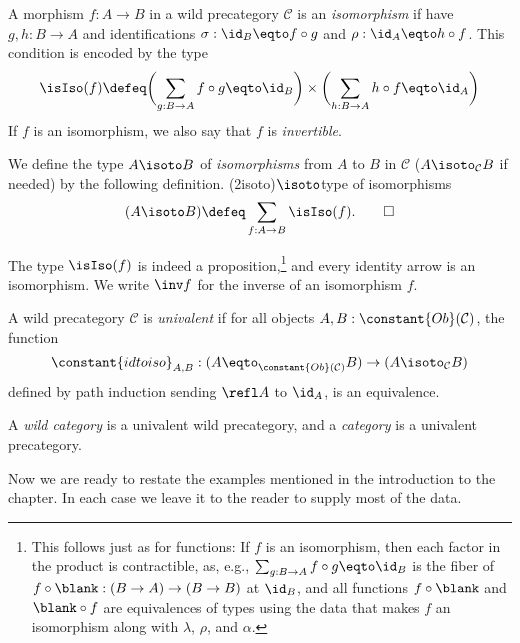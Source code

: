 \begin{definition}
  A morphism $f : A \to B$ in a wild precategory $\mathcal{C}$ is an
  \emph{isomorphism}
  if have $g, h : B \to A$ and identifications
  $\sigma : \id_B \eqto f\circ g$ and $\rho : \id_A \eqto h\circ f$.
  This condition is encoded by the type
  \[
    \isIso(f) \defeq \biggl(\sum_{g:B\to A}f\circ g\eqto\id_B\biggr)
    \times\biggl(\sum_{h:B\to A}h\circ f\eqto\id_A\biggr)
  \]
  If $f$ is an isomorphism, we also say that $f$ is \emph{invertible}.

  We define the type $A \isoto B$ of \emph{isomorphisms} from $A$ to $B$
  in $\mathcal C$ ($A \isoto_{\mathcal C} B$ if needed)
  by the following definition.%
  \glossary(2isoto){$\protect\isoto$}{type of isomorphisms}
  \[
    (A \isoto B) \defeq \sum_{f:A\to B} \isIso(f).\qedhere
  \]
\end{definition}
The type $\isIso(f)$
is indeed a proposition,\footnote{%
  This follows just as for functions: If $f$ is an isomorphism,
  then each factor in the product is contractible, as, e.g.,
  $\sum_{g:B\to A}f\circ g\eqto\id_B$ is the fiber
  of $f\circ\blank : (B \to A) \to (B \to B)$
  at $\id_B$, and all functions $f\circ\blank$ and $\blank\circ f$
  are equivalences of types using the data that makes $f$ an isomorphism
  along with $\lambda$, $\rho$, and $\alpha$.}
and every identity arrow is an isomorphism.
We write $\inv f$ for the inverse of an isomorphism $f$.
\begin{definition}
  A wild precategory $\mathcal C$ is \emph{univalent} if
  for all objects $A,B : \constant{Ob}(\mathcal C)$, the function
  \[
    \constant{idtoiso}_{A,B} : (A \eqto_{\constant{Ob}(\mathcal C)} B) \to (A \isoto_{\mathcal C} B)
  \]
  defined by path induction sending $\refl A$ to $\id_A$,
  is an equivalence.
\end{definition}
\begin{definition}\label{def:category}
  A \emph{wild category} is a univalent wild precategory,
  and a \emph{category} is a univalent precategory.
\end{definition}
Now we are ready to restate the examples mentioned in the introduction to the chapter.
In each case we leave it to the reader to supply most of the data.
